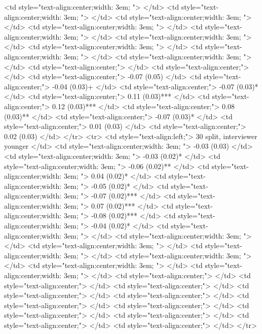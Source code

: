    <td style="text-align:center;width: 3em; ">  </td>
   <td style="text-align:center;width: 3em; ">  </td>
   <td style="text-align:center;width: 3em; ">  </td>
   <td style="text-align:center;width: 3em; ">  </td>
   <td style="text-align:center;width: 3em; ">  </td>
   <td style="text-align:center;width: 3em; ">  </td>
   <td style="text-align:center;width: 3em; ">  </td>
   <td style="text-align:center;width: 3em; ">  </td>
   <td style="text-align:center;width: 3em; ">  </td>
   <td style="text-align:center;">  </td>
   <td style="text-align:center;">  </td>
   <td style="text-align:center;"> -0.07 (0.05) </td>
   <td style="text-align:center;"> -0.04 (0.03)+ </td>
   <td style="text-align:center;"> -0.07 (0.03)* </td>
   <td style="text-align:center;"> 0.11 (0.03)*** </td>
   <td style="text-align:center;"> 0.12 (0.03)*** </td>
   <td style="text-align:center;"> 0.08 (0.03)** </td>
   <td style="text-align:center;"> -0.07 (0.03)* </td>
   <td style="text-align:center;"> 0.01 (0.03) </td>
   <td style="text-align:center;"> 0.02 (0.03) </td>
  </tr>
  <tr>
   <td style="text-align:left;"> 30 split, interviewer younger </td>
   <td style="text-align:center;width: 3em; "> -0.03 (0.03) </td>
   <td style="text-align:center;width: 3em; "> -0.03 (0.02)* </td>
   <td style="text-align:center;width: 3em; "> -0.06 (0.02)** </td>
   <td style="text-align:center;width: 3em; "> 0.04 (0.02)* </td>
   <td style="text-align:center;width: 3em; "> -0.05 (0.02)* </td>
   <td style="text-align:center;width: 3em; "> -0.07 (0.02)*** </td>
   <td style="text-align:center;width: 3em; "> 0.07 (0.02)*** </td>
   <td style="text-align:center;width: 3em; "> -0.08 (0.02)*** </td>
   <td style="text-align:center;width: 3em; "> -0.04 (0.02)* </td>
   <td style="text-align:center;width: 3em; ">  </td>
   <td style="text-align:center;width: 3em; ">  </td>
   <td style="text-align:center;width: 3em; ">  </td>
   <td style="text-align:center;width: 3em; ">  </td>
   <td style="text-align:center;width: 3em; ">  </td>
   <td style="text-align:center;width: 3em; ">  </td>
   <td style="text-align:center;width: 3em; ">  </td>
   <td style="text-align:center;">  </td>
   <td style="text-align:center;">  </td>
   <td style="text-align:center;">  </td>
   <td style="text-align:center;">  </td>
   <td style="text-align:center;">  </td>
   <td style="text-align:center;">  </td>
   <td style="text-align:center;">  </td>
   <td style="text-align:center;">  </td>
   <td style="text-align:center;">  </td>
   <td style="text-align:center;">  </td>
   <td style="text-align:center;">  </td>
  </tr>
